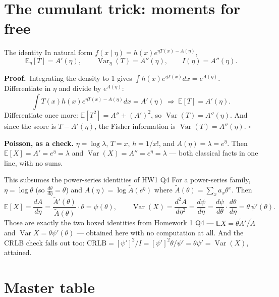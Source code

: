 \documentclass[11pt]{article}
\newcommand{\E}{\mathbb{E}}
\newcommand{\Var}{\operatorname{Var}}
\newcommand{\prf}{\smallskip\noindent\textbf{Proof.}\ }
\begin{document}
\section{The cumulant trick: moments for free}

\begin{idea}{The identity}
In natural form $f(x\mid\eta)=h(x)e^{\eta T(x)-A(\eta)}$,
\[
\boxed{\ \E_\eta[T]=A'(\eta),\qquad \Var_\eta(T)=A''(\eta),\qquad I(\eta)=A''(\eta).\ }
\]
\end{idea}

\prf Integrating the density to 1 gives $\int h(x)e^{\eta T(x)}dx=e^{A(\eta)}$. Differentiate
in $\eta$ and divide by $e^{A(\eta)}$:
\[
\int T(x)h(x)e^{\eta T(x)-A(\eta)}dx=A'(\eta)\ \Longrightarrow\ \E[T]=A'(\eta).
\]
Differentiate once more: $\E[T^{2}]=A''+(A')^{2}$, so $\Var(T)=A''(\eta)$. And since the score
is $T-A'(\eta)$, the Fisher information is $\Var(T)=A''(\eta)$. $\square$

\textbf{Poisson, as a check.} $\eta=\log\lambda$, $T=x$, $h=1/x!$, and
$A(\eta)=\lambda=e^{\eta}$. Then $\E[X]=A'=e^{\eta}=\lambda$ and $\Var(X)=A''=e^{\eta}=\lambda$
--- both classical facts in one line, with no sums.

\begin{idea}{This subsumes the power-series identities of HW1 Q4}
For a power-series family, $\eta=\log\theta$ (so $\tfrac{d\theta}{d\eta}=\theta$) and
$A(\eta)=\log \tilde A(e^{\eta})$ where $\tilde A(\theta)=\sum_xa_x\theta^{x}$. Then
\[
\E[X]=\frac{dA}{d\eta}=\frac{\tilde A'(\theta)}{\tilde A(\theta)}\cdot\theta=\psi(\theta),
\qquad
\Var(X)=\frac{d^{2}A}{d\eta^{2}}=\frac{d\psi}{d\eta}
=\frac{d\psi}{d\theta}\cdot\frac{d\theta}{d\eta}=\theta\,\psi'(\theta).
\]
Those are exactly the two boxed identities from Homework 1 Q4 ---
$\E X=\theta \tilde A'/\tilde A$ and $\Var X=\theta\psi'(\theta)$ --- obtained here with no
computation at all. And the CRLB check falls out too:
$\text{CRLB}=[\psi']^{2}/I=[\psi']^{2}\theta/\psi'=\theta\psi'=\Var(X)$, attained. \checkmark
\end{idea}

\section{Master table}
\end{document}

